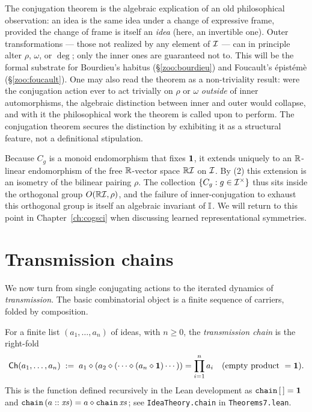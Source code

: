 \begin{remark}\label{rem:inner-meaning}
The conjugation theorem is the algebraic explication of an old
philosophical observation: an idea is the same idea under a change of
expressive frame, provided the change of frame is itself an
\emph{idea} (here, an invertible one). Outer transformations --- those
not realized by any element of $\mathcal{I}$ --- can in principle alter
$\rho$, $\omega$, or $\deg$; only the inner ones are guaranteed not to.
This will be the formal substrate for Bourdieu's habitus
(\S\ref{zoo:bourdieu}) and Foucault's épistémè
(\S\ref{zoo:foucault}). One may also read the theorem as a
non-triviality result: were the conjugation action ever to act
trivially on $\rho$ or $\omega$ \emph{outside} of inner
automorphisms, the algebraic distinction between inner and outer
would collapse, and with it the philosophical work the theorem is
called upon to perform. The conjugation theorem secures the
distinction by exhibiting it as a structural feature, not a
definitional stipulation.
\end{remark}

\begin{remark}\label{rem:linear-action}
Because $C_g$ is a monoid endomorphism that fixes $\mathbf{1}$, it
extends uniquely to an $\mathbb{R}$-linear endomorphism of the free
$\mathbb{R}$-vector space $\mathbb{R}\mathcal{I}$ on $\mathcal{I}$. By
(2) this extension is an isometry of the
bilinear pairing $\rho$. The collection
$\{C_g : g\in\mathcal{I}^{\times}\}$ thus sits inside the orthogonal
group $O(\mathbb{R}\mathcal{I},\rho)$, and the failure of inner-conjugation to
exhaust this orthogonal group is itself an algebraic invariant of
$\mathbb{I}$. We will return to this point in Chapter~\ref{ch:cogsci}
when discussing learned representational symmetries.
\end{remark}

\section{Transmission chains}\label{sec:chains}

We now turn from single conjugating actions to the iterated dynamics of
\emph{transmission}. The basic combinatorial object is a finite
sequence of carriers, folded by composition.

\begin{definition}\label{def:chain}
For a finite list $(a_1,\dots,a_n)$ of ideas, with $n\ge 0$, the
\emph{transmission chain} is the right-fold
\[
  \mathsf{Ch}(a_1,\dots,a_n)
  \;\mathrel{:=}\;
  a_1\mathbin{\diamond}(a_2\mathbin{\diamond}(\cdots\mathbin{\diamond}(a_n\mathbin{\diamond}\mathbf{1})\cdots))
  = \prod_{i=1}^{n} a_i \quad (\text{empty product } = \mathbf{1}).
\]
This is the function defined recursively in the Lean development as
$\mathtt{chain}\,[\,]=\mathbf{1}$ and $\mathtt{chain}\,(a::\mathit{xs})=
a\mathbin{\diamond}\mathtt{chain}\,\mathit{xs}$; see
\texttt{IdeaTheory.chain} in \texttt{Theorems7.lean}.
\end{definition}

